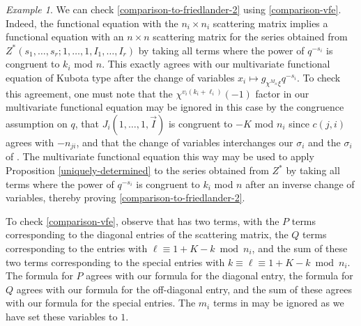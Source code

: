 \documentclass[11pt,letterpaper]{article}
\theoremstyle{definition}
\theoremstyle{remark}
\newtheorem{example}[theorem]{Example}
\numberwithin{equation}{section}
\theoremstyle{dotless}
\begin{document}
\begin{example}
We can check \eqref{comparison-to-friedlander-2} using \eqref{comparison-vfe}. Indeed, the functional equation with the $n_i \times n_i$ scattering matrix implies a functional equation with an $n\times n$ scattering matrix for the series obtained from  $Z^* ( s_1,\dots,s_r;1,\dots,1, I_1,\dots,I_r)$ by taking all terms where the power of $q^{-s_i}$ is congruent to $k_i$ mod $n$. This exactly agrees with our multivariate functional equation of Kubota type  after the change of variables $x_i \mapsto g_{ \chi^{M_{ii}} \xi} q^{-s_i}$. To check this agreement, one must note that the $\chi^{ v_i(k_i+\ell_i)}(-1)$ factor in our multivariate functional equation may be ignored in this case by the congruence assumption on $q$, that $J_i(1,\dots,1,\vec{I} )$ is congruent to $-K$ mod $n_i$ since $c(j,i)$ agrees with $-n_{ji}$, and that the change of variables interchanges our $\sigma_i$ and the $\sigma_i$ of \cite{HFriedlander23}. The multivariate functional equation this way may be used to apply Proposition \ref{uniquely-determined} to the series obtained from $Z^*$ by taking all terms where the power of $q^{-s_i}$ is congruent to $k_i$ mod $n$ after an inverse change of variables, thereby proving \eqref{comparison-to-friedlander-2}. 

To check \eqref{comparison-vfe}, observe that \cite[(20)]{HFriedlander23} has two terms, with the $P$ terms corresponding to the diagonal entries of the scattering matrix, the $Q$ terms corresponding to the entries with $\ell \equiv 1+K-k \bmod n_i$, and the sum of these two terms corresponding to the special entries with $k\equiv \ell \equiv 1+K-k\bmod n_i$. The formula for $P$ agrees with our formula for the diagonal entry, the formula for $Q$ agrees with our formula for the off-diagonal entry, and the sum of these agrees with our formula for the special entries. The $m_i$ terms in \cite[(20)]{HFriedlander23} may be ignored as we have set these variables to $1$.






\end{example}
\end{document}
